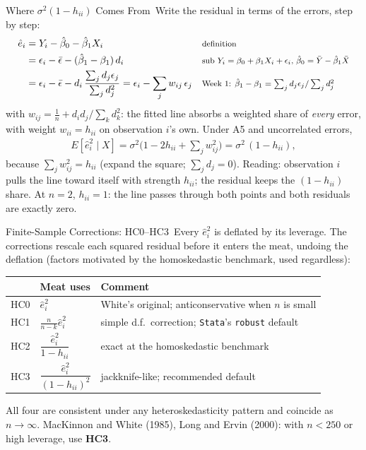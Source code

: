 \documentclass[aspectratio=169,11pt,xcolor=dvipsnames]{beamer}
\newcommand{\srct}[1]{#1}                               %
\newcommand{\E}{E}
\newcommand{\adv}{\,\raisebox{0.6pt}{\textcolor{accent}{$\bigstar$}}}
\newcommand{\core}{\,\raisebox{0.6pt}{\textcolor{corestar}{$\bigstar$}}}
\begin{document}
\begin{frame}{Where $\sigma^2(1-h_{ii})$ Comes From\adv}
Write the residual in terms of the errors, step by step:
\begingroup
\setlength{\abovedisplayskip}{3pt}\setlength{\belowdisplayskip}{3pt}
\begin{align*}
  \hat e_i &= Y_i - \hat\beta_0 - \hat\beta_1 X_i
    && \text{\footnotesize definition} \\
  &= \epsilon_i - \bar\epsilon - (\hat\beta_1 - \beta_1)\,d_i
    && \text{\footnotesize sub $Y_i = \beta_0+\beta_1X_i+\epsilon_i$,
       $\hat\beta_0 = \bar Y - \hat\beta_1\bar X$} \\
  &= \epsilon_i - \bar\epsilon
     - d_i\,\frac{\sum_j d_j\epsilon_j}{\sum_j d_j^2}
   = \epsilon_i - \sum_j w_{ij}\,\epsilon_j
    && \text{\footnotesize Week 1: $\hat\beta_1-\beta_1 =
       \textstyle\sum_j d_j\epsilon_j/\sum_j d_j^2$}
\end{align*}
\endgroup
with $w_{ij} = \tfrac1n + d_i d_j\big/\sum_k d_k^2$: the fitted line absorbs
a weighted share of \emph{every} error, with weight $w_{ii} = h_{ii}$ on
observation $i$'s own. Under A5 and uncorrelated errors,
\begin{align*}
  \E[\hat e_i^2 \mid X]
  = \sigma^2\Big(1 - 2h_{ii} + \sum_j w_{ij}^2\Big)
  = \sigma^2\,(1-h_{ii}),
\end{align*}
because $\sum_j w_{ij}^2 = h_{ii}$ (expand the square; $\sum_j d_j = 0$).
\vskip1pt
{\footnotesize Reading: observation $i$ pulls the line toward itself with
strength $h_{ii}$; the residual keeps the $(1-h_{ii})$ share. At $n=2$,
$h_{ii}=1$: the line passes through both points and both residuals are
exactly zero.}
\end{frame}

\begin{frame}{Finite-Sample Corrections: HC0--HC3\core}
Every $\hat e_i^2$ is deflated by its leverage. The corrections rescale each
squared residual before it enters the meat, undoing the deflation (factors
motivated by the homoskedastic benchmark, used regardless):
\begin{center}\small
\renewcommand{\arraystretch}{1.15}
\begin{tabular}{lll}
\toprule
& Meat uses & Comment \\
\midrule
HC0 & $\hat e_i^2$ & White's original; anticonservative when $n$ is small \\
HC1 & $\frac{n}{n-k}\hat e_i^2$ & simple d.f.\ correction; \texttt{Stata}'s
      \texttt{robust} default \\
HC2 & $\dfrac{\hat e_i^2}{1-h_{ii}}$ & exact at the homoskedastic benchmark \\
HC3 & $\dfrac{\hat e_i^2}{(1-h_{ii})^2}$ & jackknife-like; \alert{recommended default} \\
\bottomrule
\end{tabular}
\end{center}
\vskip2pt
{\footnotesize All four are consistent under any heteroskedasticity pattern
and coincide as $n \to \infty$. \srct{MacKinnon and White (1985)},
\srct{Long and Ervin (2000)}: with $n < 250$ or high leverage, use
\textbf{HC3}.}
\end{frame}
\end{document}
